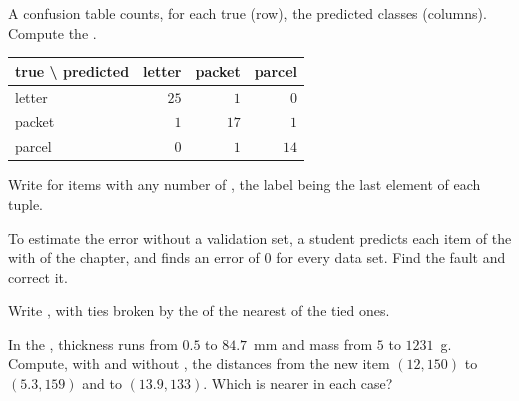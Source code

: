 \begin{exercise}[$\star$]\label{exo:g11:k-nearest-neighbours:4}
A confusion table counts, for each true  (row), the predicted classes (columns). Compute the .
\begin{center}
\begin{tabular}{lrrr}
  true \textbackslash{} predicted & letter & packet & parcel \\ \hline
  letter & $25$ & $1$ & $0$ \\
  packet & $1$ & $17$ & $1$ \\
  parcel & $0$ & $1$ & $14$
\end{tabular}
\end{center}
\end{exercise}

\begin{exercise}[$\star$]\label{exo:g11:k-nearest-neighbours:5}
Write  for items with any number of , the label being the last element of each tuple.
\end{exercise}

\begin{exercise}[$\star\star$]\label{exo:g11:k-nearest-neighbours:6}
To estimate the error without a validation set, a student predicts each item of the  with
 of the chapter, and finds an error of $0$ for every data set. Find the fault and correct it.
\end{exercise}

\begin{exercise}[$\star\star$]\label{exo:g11:k-nearest-neighbours:7}
Write , with ties broken by the  of the nearest of the tied ones.
\end{exercise}

\begin{exercise}[$\star\star$]\label{exo:g11:k-nearest-neighbours:8}
In the , thickness runs from $0.5$ to $84.7$~mm and mass from $5$ to $1231$~g. Compute, with and without
, the distances from the new item $(12, 150)$ to $(5.3, 159)$ and to $(13.9, 133)$. Which is nearer in each
case?
\end{exercise}

